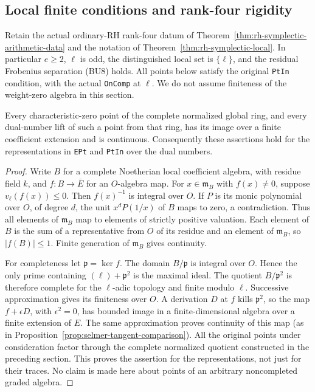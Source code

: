 \subsection{Local finite conditions and rank-four rigidity}
\label{sec:rh-symplectic-point-rigidity}

Retain the actual ordinary-RH rank-four datum of
Theorem~\ref{thm:rh-symplectic-arithmetic-data} and the notation of
Theorem~\ref{thm:rh-symplectic-local}. In particular \(e\geq2\),
\(\ell\) is odd, the distinguished local set is \(\{\ell\}\),
and the residual Frobenius separation (BU8) holds. All points below
satisfy the original \texttt{PtIn} condition, with the actual
\texttt{OnComp} at \(\ell\). We do not assume finiteness of the
weight-zero algebra in this section.

\begin{lemma}
Every characteristic-zero point of the complete normalized global
ring, and every dual-number lift of such a point from that ring,
has its image over a finite coefficient extension and is continuous.
Consequently these assertions hold for the representations in
\texttt{EPt} and \texttt{PtIn} over the dual numbers.
\end{lemma}

\begin{proof}
Write \(B\) for a complete Noetherian local coefficient algebra,
with residue field \(k\), and \(f:B\to\overline E\) for an
\(O\)-algebra map. For \(x\in\mathfrak m_B\) with \(f(x)\ne0\),
suppose \(v_\ell(f(x))\leq0\). Then \(f(x)^{-1}\) is integral
over \(O\). If \(P\) is its monic polynomial over \(O\), of
degree \(d\), the unit \(x^dP(1/x)\) of \(B\) maps to zero,
a contradiction. Thus all elements of \(\mathfrak m_B\) map
to elements of strictly positive valuation. Each element of
\(B\) is the sum of a representative from \(O\) of its residue
and an element of \(\mathfrak m_B\), so \(|f(B)|\leq1\).
Finite generation of \(\mathfrak m_B\) gives continuity.

For completeness let \(\mathfrak p=\ker f\). The domain
\(B/\mathfrak p\) is integral over \(O\). Hence the only prime
containing \((\ell)+\mathfrak p^2\) is the maximal ideal.
The quotient \(B/\mathfrak p^2\) is therefore complete for
the \(\ell\)-adic topology and finite modulo \(\ell\).
Successive approximation gives its finiteness over \(O\).
A derivation \(D\) at \(f\) kills \(\mathfrak p^2\), so the
map \(f+\epsilon D\), with \(\epsilon^2=0\), has bounded image
in a finite-dimensional algebra over a finite extension of \(E\).
The same approximation proves continuity of this map
(as in Proposition~\ref{prop:selmer-tangent-comparison}).
All the original points under consideration factor through
the complete normalized quotient constructed in the preceding
section. This proves the assertion for the representations,
not just for their traces. No claim is made here about
points of an arbitrary noncompleted graded algebra.
\end{proof}

